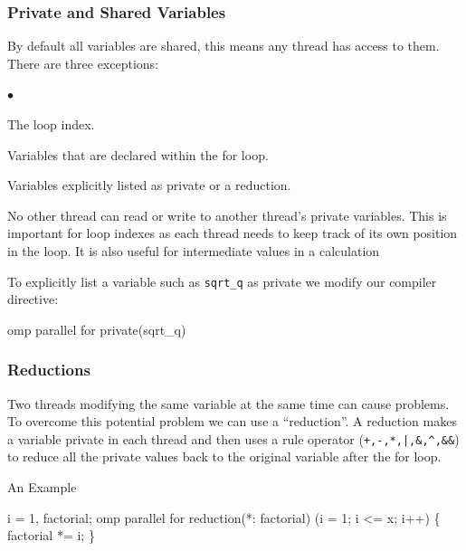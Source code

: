 \documentclass[smaller,handout,table]{beamer}
\begin{document}
\begin{frame}[fragile]
\frametitle{Private and Shared Variables}
\begin{block}{}
By default all variables are shared, this means any thread has access to them. There are three exceptions:
\begin{list}{$\bullet$}{}
\item The loop index.
\item Variables that are declared within the for loop.
\item Variables explicitly listed as private or a reduction.
\end{list}
\end{block}
\begin{block}{}
No other thread can read or write to another thread's private variables. This is important for loop indexes as each thread needs to keep track of its own position in the loop. It is also useful for intermediate values in a calculation
\end{block}
\begin{block}{}
To explicitly list a variable such as \texttt{sqrt\_q} as private we modify our compiler directive:
\begin{semiverbatim}
 omp parallel for private(sqrt\_q)
\end{semiverbatim}
\end{block}
\end{frame}

\begin{frame}[fragile]
\frametitle{Reductions}
\begin{block}{}
Two threads modifying the same variable at the same time can cause problems. To overcome this potential problem we can use a ``reduction''. A reduction makes a variable private in each thread and then uses a rule operator (\verb#+,-,*,|,&,^,&&#) to reduce all the private values back to the original variable after the for loop.
\end{block}
\begin{block}{An Example}
\begin{semiverbatim}
\kl{} i = 1, factorial;
\kl{} omp parallel for reduction(*: factorial)
\kl{} (i = 1; i <= x; i++)
\kl\{
\kl    factorial *= i;
\kl\}
\end{semiverbatim}
\end{block}
\end{frame}
\end{document}
